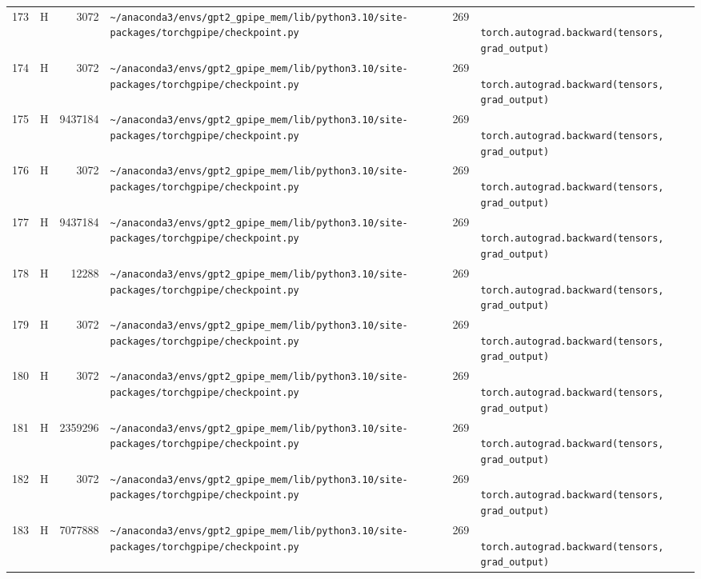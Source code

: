 \documentclass{article}
\begin{document}
\begin{longtable}{r l r p{6.5cm} r p{7.0cm}}
173 & H & 3072 & \lstinline|~/anaconda3/envs/gpt2_gpipe_mem/lib/python3.10/site-packages/torchgpipe/checkpoint.py| & 269 & \lstinline|            torch.autograd.backward(tensors, grad_output)| \\
174 & H & 3072 & \lstinline|~/anaconda3/envs/gpt2_gpipe_mem/lib/python3.10/site-packages/torchgpipe/checkpoint.py| & 269 & \lstinline|            torch.autograd.backward(tensors, grad_output)| \\
175 & H & 9437184 & \lstinline|~/anaconda3/envs/gpt2_gpipe_mem/lib/python3.10/site-packages/torchgpipe/checkpoint.py| & 269 & \lstinline|            torch.autograd.backward(tensors, grad_output)| \\
176 & H & 3072 & \lstinline|~/anaconda3/envs/gpt2_gpipe_mem/lib/python3.10/site-packages/torchgpipe/checkpoint.py| & 269 & \lstinline|            torch.autograd.backward(tensors, grad_output)| \\
177 & H & 9437184 & \lstinline|~/anaconda3/envs/gpt2_gpipe_mem/lib/python3.10/site-packages/torchgpipe/checkpoint.py| & 269 & \lstinline|            torch.autograd.backward(tensors, grad_output)| \\
178 & H & 12288 & \lstinline|~/anaconda3/envs/gpt2_gpipe_mem/lib/python3.10/site-packages/torchgpipe/checkpoint.py| & 269 & \lstinline|            torch.autograd.backward(tensors, grad_output)| \\
179 & H & 3072 & \lstinline|~/anaconda3/envs/gpt2_gpipe_mem/lib/python3.10/site-packages/torchgpipe/checkpoint.py| & 269 & \lstinline|            torch.autograd.backward(tensors, grad_output)| \\
180 & H & 3072 & \lstinline|~/anaconda3/envs/gpt2_gpipe_mem/lib/python3.10/site-packages/torchgpipe/checkpoint.py| & 269 & \lstinline|            torch.autograd.backward(tensors, grad_output)| \\
181 & H & 2359296 & \lstinline|~/anaconda3/envs/gpt2_gpipe_mem/lib/python3.10/site-packages/torchgpipe/checkpoint.py| & 269 & \lstinline|            torch.autograd.backward(tensors, grad_output)| \\
182 & H & 3072 & \lstinline|~/anaconda3/envs/gpt2_gpipe_mem/lib/python3.10/site-packages/torchgpipe/checkpoint.py| & 269 & \lstinline|            torch.autograd.backward(tensors, grad_output)| \\
183 & H & 7077888 & \lstinline|~/anaconda3/envs/gpt2_gpipe_mem/lib/python3.10/site-packages/torchgpipe/checkpoint.py| & 269 & \lstinline|            torch.autograd.backward(tensors, grad_output)| \\

\end{longtable}
\end{document}
